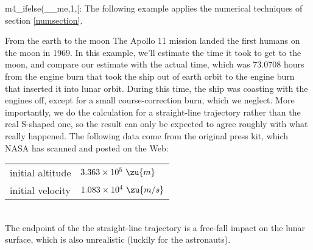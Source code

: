 m4_ifelse(__me,1,[:
        The following example applies the numerical techniques of section
        \ref{numsection}.

        \begin{eg}{From the earth to the moon}
        The Apollo 11 mission landed the first humans on the moon in 1969.
        In this example, we'll estimate the time it took to get to the moon, and compare
        our estimate with the actual time, which was 73.0708 hours from the engine
        burn that took the ship out of earth orbit to the engine burn that inserted it into
        lunar orbit. During this time, the ship was coasting with the engines off, except
        for a small course-correction burn, which we neglect. More importantly, we
        do the calculation for a straight-line trajectory rather than the real S-shaped one,
        so the result can only be expected to agree roughly with what really happened.
        The following data come from the original press kit, which NASA has scanned and
        posted on the Web:\\
        \begin{tabular}{ll}
                \qquad initial altitude & $ 3.363\times10^5\ \zu{m}$\\
                \qquad initial velocity & $ 1.083\times10^4\ \zu{m/s}$\\
        \end{tabular}\\
        The endpoint of the the straight-line trajectory is a free-fall impact on
        the lunar surface, which is also unrealistic (luckily for the astronauts).


\end{eg}
